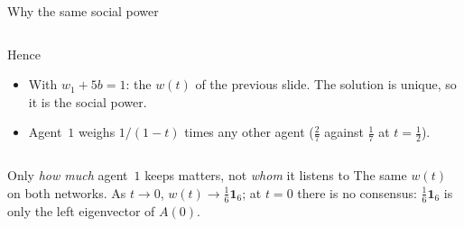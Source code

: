 \documentclass[10pt, aspectratio=169]{beamer}
\begin{document}
\begin{frame}[label=m-fdg-why]{Why the same social power}
\begin{columns}[T]
\begin{block}{Hence}
\begin{itemize}
          \item With $w_1 + 5b = 1$: the $w(t)$ of the previous slide. The solution is
                unique, so it is the social power.
          \item Agent~$1$ weighs $1/(1-t)$ times any other agent ($\frac27$ against
                $\frac17$ at $t = \frac12$).
        \end{itemize}
      \end{block}
  \end{columns}
  \begin{alertblock}{Only \emph{how much} agent~$1$ keeps matters, not \emph{whom} it listens to}
    \footnotesize
    The same $w(t)$ on both networks. As $t \to 0$, $w(t) \to \frac16\mathbf{1}_6$; at
    $t = 0$ there is no consensus: $\frac16\mathbf{1}_6$ is only the left eigenvector of $A(0)$.
  \end{alertblock}
\end{frame}
\end{document}
